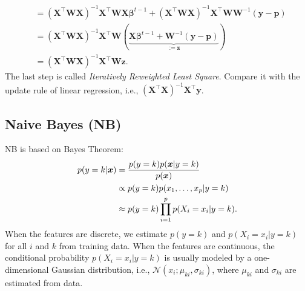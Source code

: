 \begin{itemize}
\begin{equation}
\begin{aligned}
                                         & = \left(\bm{X}^\top \bm{W} \bm{X}\right)^{-1}\bm{X}^\top \bm{W} \bm{X} \bm{\beta}^{t-1} + \left(\bm{X}^\top \bm{W} \bm{X}\right)^{-1} \bm{X}^\top \bm{W} \bm{W}^{-1} (\bm{y} - \bm{p}) \\
                                         & = \left(\bm{X}^\top \bm{W} \bm{X}\right)^{-1}\bm{X}^\top \bm{W} \left( \underbrace{\bm{X}\bm{\beta}^{t-1} + \bm{W}^{-1}(\bm{y} - \bm{p})}_{:=\bm{z}} \right) \\
                                         & = \left(\bm{X}^\top \bm{W} \bm{X}\right)^{-1}\bm{X}^\top \bm{W} \bm{z}.
                        \end{aligned}
                    \end{equation}
                The last step is called \emph{Iteratively Reweighted Least Square}.
                Compare it with the update rule of linear regression, i.e., $\left( \bm{X}^\top \bm{X}\right)^{-1} \bm{X}^\top \bm{y}$.
            \end{itemize}
            
    \subsection{Naive Bayes (NB)}
        NB is based on Bayes Theorem: 
            \begin{equation}
                \begin{aligned}
                    p(y=k | \bm{x}) & = \frac{p(y=k) p(\bm{x} | y=k)}{p(\bm{x})} \\
                    & \propto p(y=k) p(x_1, \ldots, x_{p} | y=k) \\
                    & \approx p(y=k) \prod_{i=1}^{p}{p(X_i = x_i | y=k)}.
                \end{aligned}
            \end{equation}
        When the features are discrete, we estimate $p(y=k)$ and $p(X_i = x_i | y=k)$ for all $i$ and $k$ from training data.
        When the features are continuous, the conditional probability $p(X_i = x_i | y=k)$ is usually modeled by a one-dimensional Gaussian distribution, i.e., $\mathcal{N}(x_i; \mu_{ki}, \sigma_{ki})$, where $\mu_{ki}$ and $\sigma_{ki}$ are estimated from data.
        

